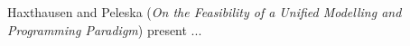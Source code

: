 

Haxthausen and Peleska
\cite{isola-2016-haxthausen}
({\em On the Feasibility of a Unified Modelling and
Programming Paradigm})
present ...
